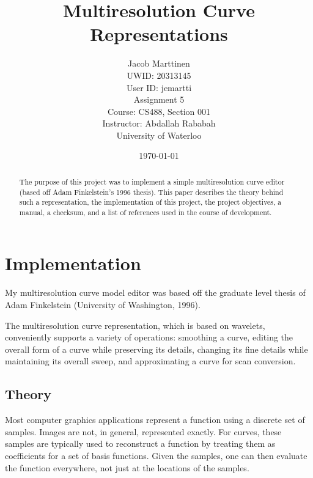 \documentclass[11pt]{article}
\begin{document}
\begin{titlepage}
\title{Multiresolution Curve Representations}

\author{Jacob Marttinen\\
UWID: 20313145\\
User ID: jemartti\\
Assignment 5\\
Course: CS488, Section 001\\
Instructor: Abdallah Rababah\\
University of Waterloo}

\date{\today}
\maketitle
\end{titlepage}

\begin{abstract}
The purpose of this project was to implement a simple multiresolution curve editor (based off Adam Finkelstein's 1996 thesis). This paper describes the theory behind such a representation, the implementation of this project, the project objectives, a manual, a checksum, and a list of references used in the course of development.
\end{abstract}

\section{Implementation}
\label{sec:implementation}
My multiresolution curve model editor was based off the graduate level thesis of Adam Finkelstein (University of Washington, 1996).

The multiresolution curve representation, which is based on wavelets, conveniently supports a variety of operations: smoothing a curve, editing the overall form of a curve while preserving its details, changing its fine details while maintaining its overall sweep, and approximating a curve for scan conversion.

\subsection{Theory}
\label{sec:theory}
Most computer graphics applications represent a function using a discrete set of samples. Images are not, in general, represented exactly. For curves, these samples are typically used to reconstruct a function by treating them as coefficients for a set of basis functions. Given the samples, one can then evaluate the function everywhere, not just at the locations of the samples.
\end{document}
